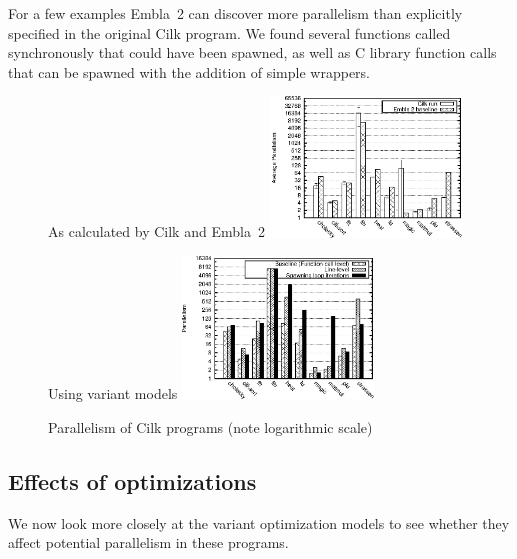 For a few examples Embla~2 can discover more parallelism than explicitly specified in the original Cilk program.
We found several functions called synchronously that could have been spawned,
as well as C library function calls
that can be spawned with the addition of simple wrappers.

\begin{figure}[t]
 \begin{center}
  \begin{SubFloat}{\label{cilk-run}As calculated by Cilk and Embla~2}
   \includegraphics[width=2.0in]{cilk-run}
  \end{SubFloat}
 \qquad
  \begin{SubFloat}{\label{cilk-gran-loop}Using variant models}
   \includegraphics[width=2.0in]{cilk-gran-loop}
  \end{SubFloat}
 \end{center}
 \caption{Parallelism of Cilk programs (note logarithmic scale)}
\end{figure}

\subsection{Effects of optimizations} \label{sresults:cilk-opts}

We now look more closely at the variant optimization models to see whether they affect potential parallelism in these programs.

